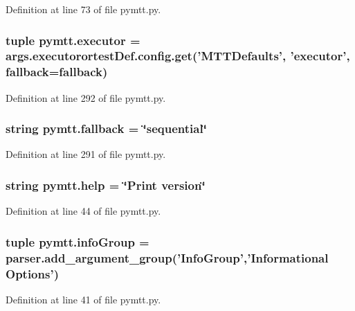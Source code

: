Definition at line 73 of file pymtt.\-py.

\hypertarget{namespacepymtt_a283715e769294f7b1362c85498cdf2a3}{
\subsubsection[{executor}]{\setlength{\rightskip}{0pt plus 5cm}tuple pymtt.\-executor = args.\-executorortest\-Def.\-config.\-get('M\-T\-T\-Defaults', 'executor', {\bf fallback}={\bf fallback})}}\label{namespacepymtt_a283715e769294f7b1362c85498cdf2a3}


Definition at line 292 of file pymtt.\-py.

\hypertarget{namespacepymtt_a5d5ee597f85e5c40ec6a923a4398c291}{
\subsubsection[{fallback}]{\setlength{\rightskip}{0pt plus 5cm}string pymtt.\-fallback = \char`\"{}sequential\char`\"{}}}\label{namespacepymtt_a5d5ee597f85e5c40ec6a923a4398c291}


Definition at line 291 of file pymtt.\-py.

\hypertarget{namespacepymtt_a21e88c39af91deb569da20633d245b09}{
\subsubsection[{help}]{\setlength{\rightskip}{0pt plus 5cm}string pymtt.\-help = \char`\"{}Print version\char`\"{}}}\label{namespacepymtt_a21e88c39af91deb569da20633d245b09}


Definition at line 44 of file pymtt.\-py.

\hypertarget{namespacepymtt_a99ad2929ecc4e17f97670bed44f08c35}{
\subsubsection[{info\-Group}]{\setlength{\rightskip}{0pt plus 5cm}tuple pymtt.\-info\-Group = parser.\-add\-\_\-argument\-\_\-group('Info\-Group','Informational Options')}}\label{namespacepymtt_a99ad2929ecc4e17f97670bed44f08c35}


Definition at line 41 of file pymtt.\-py.

